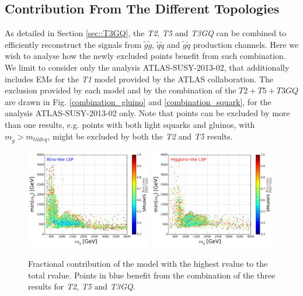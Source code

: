 \documentclass[a4paper,11pt]{article}
\begin{document}
\subsection{Contribution From The Different Topologies}
As detailed in Section \ref{sec::T3GQ}, the \textit{T2}, \textit{T5} and \textit{T3GQ} can be combined to efficiently reconstruct the signals from $\tilde g \tilde g$, $\tilde q \tilde q$ and $\tilde g \tilde q$ production channels. Here we wish to analyse how the newly excluded points benefit from such combination. We limit to consider only the analysis ATLAS-SUSY-2013-02, that additionally includes EMs for the \textit{T1} model provided by the ATLAS collaboration. The exclusion provided by each model and by the combination of the $T2+T5+T3GQ$ are drawn in Fig. \ref{combination_gluino} and \ref{combination_squark}, for the analysis ATLAS-SUSY-2013-02 only. Note that points can be excluded by more than one results, e.g. points with both light squarks and gluinos, with $m_{\tilde g} > m_{tilde q}$, might be excluded by both the \textit{T2} and \textit{T5} results. 
%
\begin{figure}[!]
\begin{center}
\subfigure
\includegraphics[width=0.49\textwidth]{PLOTS/Weights/BINO_rValus_Glu_Sq_Ratio.png}
\subfigure
{\includegraphics[width=0.49\textwidth]{PLOTS/Weights/HIGGSINO_rValus_Glu_Sq_Ratio.png}}
\end{center}
\caption{Fractional contribution of the model with the highest rvalue to the total rvalue. Points in blue benefit from the combination of the three results for \textit{T2}, \textit{T5} and \textit{T3GQ}.} 
\label{rValues}
\end{figure}
\end{document}
